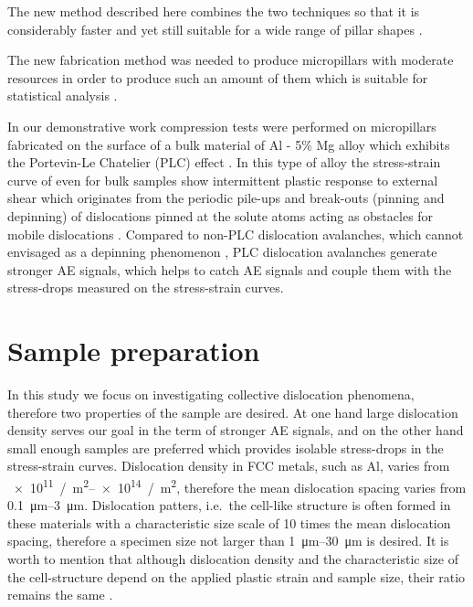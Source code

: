 The new method described here combines the two techniques so that it is considerably faster and yet still suitable for a wide range of pillar shapes \cite{wurster2015novel}.

The new fabrication method was needed to produce micropillars with moderate resources in order to produce such an amount of them which is suitable for statistical analysis \cite{ispanovity2010submicron}.

In our demonstrative work compression tests were performed on micropillars fabricated on the surface of a bulk material of Al - 5\% Mg alloy which exhibits the Portevin-Le Chatelier (PLC)  effect \cite{TABATA1980795,chinh2000critical,GUBICZA200455,1468-6996-12-6-063001}. In this type of alloy the stress-strain curve of even for bulk samples show intermittent plastic response to external shear which originates from the periodic pile-ups and break-outs (pinning and depinning) of dislocations pinned at the solute atoms acting as obstacles for mobile dislocations \cite{GUBICZA200455,1468-6996-12-6-063001}. Compared to non-PLC dislocation avalanches, which cannot envisaged as a depinning phenomenon \cite{PhysRevLett.112.235501}, PLC dislocation avalanches generate stronger AE signals, which helps to catch AE signals and couple them with the stress-drops measured on the stress-strain curves.

\section{Sample preparation}
In this study we focus on investigating collective dislocation phenomena, therefore two properties of the sample are desired. At one hand large dislocation density serves our goal in the term of stronger AE signals, and on the other hand small enough samples are preferred which provides isolable stress-drops in the stress-strain curves. Dislocation density in FCC metals, such as Al, varies from \SIrange{e11}{e14}{/m^2}, therefore the mean dislocation spacing varies from \SIrange{0.1}{3}{\micro\meter}. Dislocation patters, i.e.\ the cell-like structure is often formed in these materials with a characteristic size scale of 10 times the mean dislocation spacing, therefore a specimen size not larger than \SIrange{1}{30}{\micro\meter} is desired. It is worth to mention that although dislocation density and the characteristic size of the cell-structure depend on the applied plastic strain and sample size, their ratio remains the same \cite{doi:10.1080/14786435.2014.906755,el2015unravelling}.

